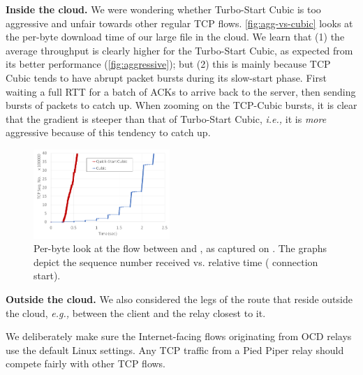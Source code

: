 \documentclass[newfonts=false,format=sigconf,anonymous,10pt,letterpaper]{acmart}
\providecommand{\vs}{vs. }
\providecommand{\ie}{\emph{i.e.,} }
\providecommand{\eg}{\emph{e.g.,} }
\newcommand{\T}[1]{\smallskip\noindent\textbf{#1}} %
\newcommand{\oursys}{Pied Piper\xspace}
\begin{document}
\T{Inside the cloud.} We were wondering whether Turbo-Start Cubic is too aggressive and unfair towards other regular TCP flows.%
\autoref{fig:agg-vs-cubic} looks at the per-byte download time of our large file in the cloud. We learn that (1) the average throughput is clearly higher for the Turbo-Start Cubic, as expected from its better performance (\autoref{fig:aggressive}); but (2) this is mainly because TCP Cubic tends to have abrupt packet bursts during its slow-start phase. First waiting a full RTT for a batch of ACKs to arrive back to the server, then sending bursts of packets to catch up. When zooming on the TCP-Cubic bursts, it is clear that the gradient is steeper than that of Turbo-Start Cubic, \ie it is \textit{more} aggressive because of this tendency to catch up. 
\begin{figure}[!t]
  \centering
    \includegraphics[width=0.46\textwidth,trim=20mm 25mm 25mm 20mm,clip]{figures/CubicVsAggressive-seq}
    \caption{Per-byte look at the flow between \rs and \rc, as captured on \rc. The graphs depict the sequence number received \vs relative time ( connection start). %
    }
    \label{fig:agg-vs-cubic}
\end{figure}

\T{Outside the cloud.} We also considered the legs of the route that reside outside the cloud, \eg between the client and the relay \rc closest to it. %

We deliberately make sure the Internet-facing flows originating from OCD relays use the default Linux settings. Any TCP traffic from a \oursys relay should compete fairly with other TCP flows.%
\end{document}

